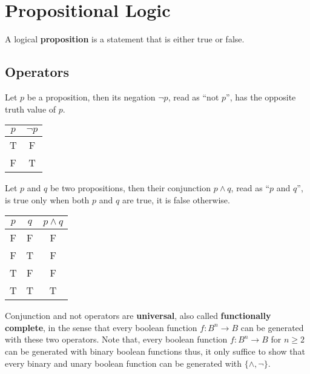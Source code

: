 \chapter{Propositional Logic}
\thispagestyle{headings}
A logical \textbf{proposition} is a statement that is either true or false.
\section{Operators}
\begin{definition} [Negation]
Let \(p\) be a proposition, then its negation \(\neg p\), read as ``not \(p\)'', has the opposite truth value of \(p\).
\begin{center}
    \begin{tabular}[c]{c | c}
        \(p\) & \(\neg p\) \\ \hline
        T     & F          \\
        F     & T
    \end{tabular}
\end{center}
\end {definition}

\begin{definition}[Conjunction]
    Let \(p\) and \(q\) be two propositions, then their conjunction \(p \land q\), read as ``\(p\) and \(q\)'', is true only when both \(p\) and \(q\) are true, it is false otherwise.
    \begin{center}
        \begin{tabular}[c]{c  c | c}
            \(p\) & \(q\) & \(p \land q\) \\ \hline
            F     & F     & F             \\
            F     & T     & F             \\
            T     & F     & F             \\
            T     & T     & T             \\
        \end{tabular}
    \end{center}
\end{definition}

Conjunction and not operators are \textbf{universal}, also called \textbf{functionally complete}, in the sense that every boolean function \(f: B^n \to B\) can be generated with these two operators. Note that, every boolean function \(f : B^n \to B\) for \(n \geq 2\) can be generated with binary boolean functions thus, it only suffice to show that every binary and unary boolean function can be generated with \(\{\land, \neg\}\).


